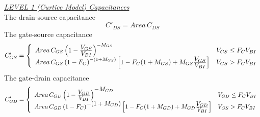 \noindent\underline{\sl LEVEL 1 (Curtice Model) Capacitances}\\[0.1in]
The drain-source capacitance
\begin{equation}
C'_{DS} = Area\,C_{DS}
\end{equation}
The gate-source capacitance
\begin{equation}
C'_{GS} = \left\{ \begin{array}{ll}
         Area\,C_{GS}\left(1 - {{\textstyle V_{GS}}\over{\textstyle V_{BI}}}
         \right)^{-M_{GS}}
         & V_{GS} \le F_C V_{BI}\\
         Area\,C_{GS}\left(1 -F_C\right)^{-(1+M_{GS})}
         \left[1-F_C(1+M_{GS})+M_{GS} {{\textstyle V_{GS}}\over{\textstyle V_{BI}}}
         \right]
         & V_{GS} > F_C V_{BI}
         \end{array} \right. %
\end{equation}
The gate-drain capacitance
\begin{equation}
C'_{GD} = \left\{ \begin{array}{ll}
         Area\,C_{GD}\left(1 - {{\textstyle V_{GD}}\over{\textstyle V_{BI}}}
         \right)^{\textstyle -M_{GD}}
         & V_{GD} \le F_C V_{BI}\\
         Area\,C_{GD}\left(1 -F_C\right)^{\textstyle -(1+M_{GD})}
         \left[1-F_C(1+M_{GD})+M_{GD} {{\textstyle V_{GD}}\over
         {\textstyle V_{BI}}} \right]
         & V_{GS} > F_C V_{BI}
         \end{array} \right. %
\end{equation}

